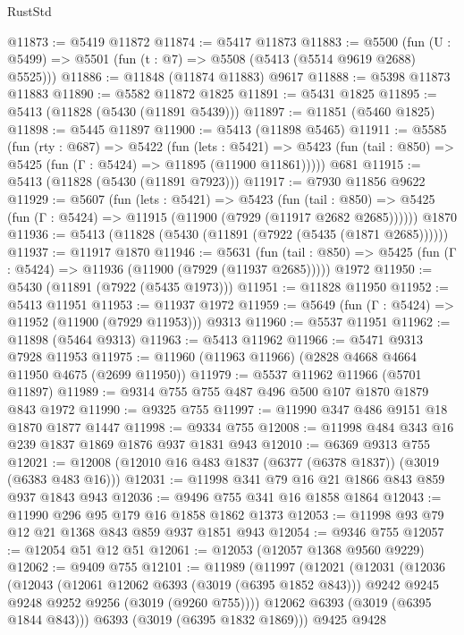 \begin{lexlean}{RustStd}
\begin{coremodule}
@11873 := @5419 @11872
@11874 := @5417 @11873
@11883 := @5500 (fun (U : @5499) => @5501 (fun (t : @7) => @5508 (@5413 (@5514 @9619 @2688) @5525)))
@11886 := @11848 (@11874 @11883) @9617
@11888 := @5398 @11873 @11883
@11890 := @5582 @11872 @1825
@11891 := @5431 @1825
@11895 := @5413 (@11828 (@5430 (@11891 @5439)))
@11897 := @11851 (@5460 @1825)
@11898 := @5445 @11897
@11900 := @5413 (@11898 @5465)
@11911 := @5585
    (fun (rty : @687) =>
    @5422
      (fun (lets : @5421) =>
      @5423 (fun (tail : @850) => @5425 (fun (Γ : @5424) => @11895 (@11900 @11861)))))
    @681
@11915 := @5413 (@11828 (@5430 (@11891 @7923)))
@11917 := @7930 @11856 @9622
@11929 := @5607
    (fun (lets : @5421) =>
    @5423
      (fun (tail : @850) =>
      @5425 (fun (Γ : @5424) => @11915 (@11900 (@7929 (@11917 @2682 @2685))))))
    @1870
@11936 := @5413 (@11828 (@5430 (@11891 (@7922 (@5435 (@1871 @2685))))))
@11937 := @11917 @1870
@11946 := @5631
    (fun (tail : @850) => @5425 (fun (Γ : @5424) => @11936 (@11900 (@7929 (@11937 @2685)))))
    @1972
@11950 := @5430 (@11891 (@7922 (@5435 @1973)))
@11951 := @11828 @11950
@11952 := @5413 @11951
@11953 := @11937 @1972
@11959 := @5649 (fun (Γ : @5424) => @11952 (@11900 (@7929 @11953))) @9313
@11960 := @5537 @11951
@11962 := @11898 (@5464 @9313)
@11963 := @5413 @11962
@11966 := @5471 @9313 @7928 @11953
@11975 := @11960 (@11963 @11966) (@2828 @4668 @4664 @11950 @4675 (@2699 @11950))
@11979 := @5537 @11962 @11966 (@5701 @11897)
@11989 := @9314 @755 @755 @487 @496 @500 @107 @1870 @1879 @843 @1972
@11990 := @9325 @755
@11997 := @11990 @347 @486 @9151 @18 @1870 @1877 @1447
@11998 := @9334 @755
@12008 := @11998 @484 @343 @16 @239 @1837 @1869 @1876 @937 @1831 @943
@12010 := @6369 @9313 @755
@12021 := @12008 (@12010 @16 @483 @1837 (@6377 (@6378 @1837)) (@3019 (@6383 @483 @16)))
@12031 := @11998 @341 @79 @16 @21 @1866 @843 @859 @937 @1843 @943
@12036 := @9496 @755 @341 @16 @1858 @1864
@12043 := @11990 @296 @95 @179 @16 @1858 @1862 @1373
@12053 := @11998 @93 @79 @12 @21 @1368 @843 @859 @937 @1851 @943
@12054 := @9346 @755
@12057 := @12054 @51 @12 @51
@12061 := @12053 (@12057 @1368 @9560 @9229)
@12062 := @9409 @755
@12101 := @11989
    (@11997
      (@12021
        (@12031
          (@12036
            (@12043
              (@12061 @12062 @6393 (@3019 (@6395 @1852 @843)))
              @9242
              @9245
              @9248
              @9252
              @9256
              (@3019 (@9260 @755))))
          @12062
          @6393
          (@3019 (@6395 @1844 @843)))
        @6393
        (@3019 (@6395 @1832 @1869)))
      @9425
      @9428

\end{coremodule}
\end{lexlean}
